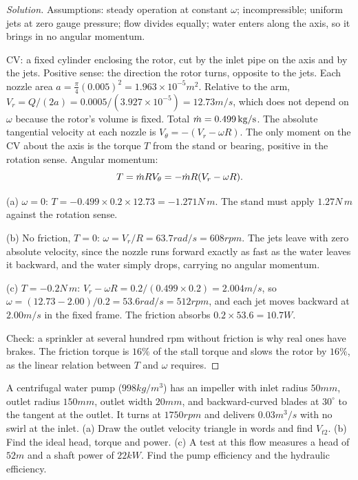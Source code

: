 \begin{proof}[Solution]
Assumptions: steady operation at constant $\omega$; incompressible; uniform jets at zero gauge pressure; flow divides equally; water enters along the axis, so it brings in no angular momentum.

CV: a fixed cylinder enclosing the rotor, cut by the inlet pipe on the axis and by the jets. Positive sense: the direction the rotor turns, opposite to the jets. Each nozzle area $a = \tfrac{\pi}{4}(0.005)^2 = 1.963\times10^{-5}\unit{m^2}$. Relative to the arm, $V_r = Q/(2a) = 0.0005/(3.927\times10^{-5}) = 12.73\unit{m/s}$, which does not depend on $\omega$ because the rotor's volume is fixed. Total $\dot m = 0.499\,\mathrm{kg/s}$. The absolute tangential velocity at each nozzle is $V_\theta = -(V_r - \omega R)$. The only moment on the CV about the axis is the torque $T$ from the stand or bearing, positive in the rotation sense. Angular momentum:
\[
T = \dot m R V_\theta = -\dot m R(V_r - \omega R).
\]

(a) $\omega = 0$: $T = -0.499\times0.2\times12.73 = -1.271\unit{N\,m}$. The stand must apply $1.27\unit{N\,m}$ against the rotation sense.

(b) No friction, $T = 0$: $\omega = V_r/R = 63.7\unit{rad/s} = 608\unit{rpm}$. The jets leave with zero absolute velocity, since the nozzle runs forward exactly as fast as the water leaves it backward, and the water simply drops, carrying no angular momentum.

(c) $T = -0.2\unit{N\,m}$: $V_r - \omega R = 0.2/(0.499\times0.2) = 2.004\unit{m/s}$, so $\omega = (12.73 - 2.00)/0.2 = 53.6\unit{rad/s} = 512\unit{rpm}$, and each jet moves backward at $2.00\unit{m/s}$ in the fixed frame. The friction absorbs $0.2\times53.6 = 10.7\unit{W}$.

Check: a sprinkler at several hundred rpm without friction is why real ones have brakes. The friction torque is $16\%$ of the stall torque and slows the rotor by $16\%$, as the linear relation between $T$ and $\omega$ requires.
\end{proof}

\begin{example}
A centrifugal water pump ($998\unit{kg/m^3}$) has an impeller with inlet radius $50\unit{mm}$, outlet radius $150\unit{mm}$, outlet width $20\unit{mm}$, and backward-curved blades at $30^\circ$ to the tangent at the outlet. It turns at $1750\unit{rpm}$ and delivers $0.03\unit{m^3/s}$ with no swirl at the inlet. (a) Draw the outlet velocity triangle in words and find $V_{t2}$. (b) Find the ideal head, torque and power. (c) A test at this flow measures a head of $52\unit{m}$ and a shaft power of $22\unit{kW}$. Find the pump efficiency and the hydraulic efficiency.
\end{example}

